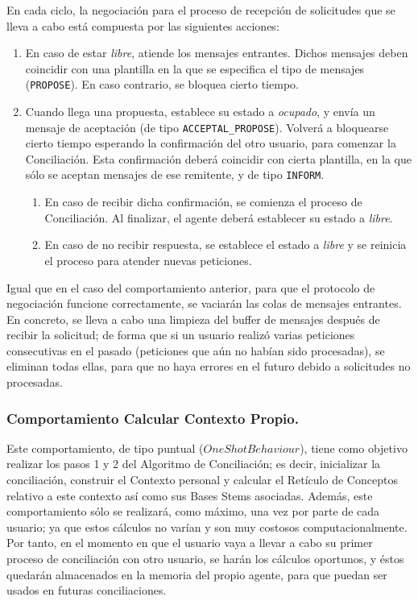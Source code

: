 En cada ciclo, la negociación para el proceso de recepción de solicitudes que se lleva a cabo está compuesta por las siguientes acciones:

\begin{enumerate}
	\item En caso de estar \emph{libre}, atiende los mensajes entrantes. Dichos mensajes deben coincidir con una plantilla en la que se especifica el tipo de mensajes ({\tt PROPOSE}). En caso contrario, se bloquea cierto tiempo.
	\item Cuando llega una propuesta, establece su estado a \emph{ocupado}, y envía un mensaje de aceptación (de tipo {\tt ACCEPTAL\_PROPOSE}). Volverá a bloquearse cierto tiempo esperando la confirmación del otro usuario, para comenzar la Conciliación. Esta confirmación deberá coincidir con cierta plantilla, en la que sólo se aceptan mensajes de ese remitente, y de tipo {\tt INFORM}.
	\begin{enumerate}
		\item En caso de recibir dicha confirmación, se comienza el proceso de Conciliación. Al finalizar, el agente deberá establecer su estado a \emph{libre}.
		\item En caso de no recibir respuesta, se establece el estado a \emph{libre} y se reinicia el proceso para atender nuevas peticiones.
	\end{enumerate}
\end{enumerate}

Igual que en el caso del comportamiento anterior, para que el protocolo de negociación funcione correctamente, se vaciarán las colas de mensajes entrantes. En concreto, se lleva a cabo una limpieza del buffer de mensajes después de recibir la solicitud; de forma que si un usuario realizó varias peticiones consecutivas en el pasado (peticiones que aún no habían sido procesadas), se eliminan todas ellas, para que no haya errores en el futuro debido a solicitudes no procesadas.



\subsubsection{Comportamiento Calcular Contexto Propio.}

Este comportamiento, de tipo puntual ($OneShotBehaviour$), tiene como objetivo realizar los pasos 1 y 2 del Algoritmo de Conciliación; es decir, inicializar la conciliación, construir el Contexto personal y calcular el Retículo de Conceptos relativo a este contexto así como sus Bases Stems asociadas. Además, este comportamiento sólo se realizará, como máximo, una vez por parte de cada usuario; ya que estos cálculos no varían y son muy costosos computacionalmente. Por tanto, en el momento en que el usuario vaya a llevar a cabo su primer proceso de conciliación con otro usuario, se harán los cálculos oportunos, y éstos quedarán almacenados en la memoria del propio agente, para que puedan ser usados en futuras conciliaciones.

